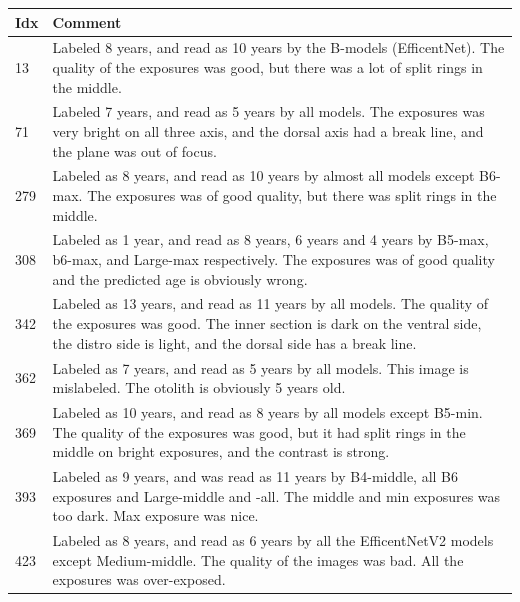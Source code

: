 \documentclass[10pt,letterpaper]{article}
\begin{document}
\pagebreak
    \centering
    \setlength\tabcolsep{1.5pt} %
    \renewcommand{\arraystretch}{0.8}
    \begin{tabular}{|l|p{13cm}|}
    \hline
        Idx & Comment \\ \hline
        13  & Labeled 8 years, and read as 10 years by the B-models (EfficentNet). \newline
              The quality of the exposures was good, but there was a lot of split rings in the middle. \\ \hline
        71  & Labeled 7 years, and read as 5 years by all models. \newline
              The exposures was very bright on all three axis, and the dorsal axis had a break line, and the plane was out of focus. \\ \hline
        279 & Labeled as 8 years, and read as 10 years by almost all models except B6-max. \newline
              The exposures was of good quality, but there was split rings in the middle. \\ \hline
        308 & Labeled as 1 year, and read as 8 years, 6 years and 4 years by B5-max, b6-max, and Large-max respectively.  \newline
              The exposures was of good quality and the predicted age is obviously wrong. \\ \hline
        342 & Labeled as 13 years, and read as 11 years by all models. The quality of the exposures was good. \newline
              The inner section is dark on the ventral side, the distro side is light, and the dorsal side has a break line.  \\ \hline
        362 & Labeled as 7 years, and read as 5 years by all models. This image is mislabeled. The otolith is obviously 5 years old.\\ \hline
        369 & Labeled as 10 years, and read as 8 years by all models except B5-min.   \newline
              The quality of the exposures was good, but it had split rings in the middle on bright exposures, and the contrast is strong. \\ \hline
        393 & Labeled as 9 years, and was read as 11 years by B4-middle, all B6 exposures and Large-middle and -all. \newline
              The middle and min exposures was too dark. Max exposure was nice. \\ \hline
        423 & Labeled as 8 years, and read as 6 years by all the EfficentNetV2 models except Medium-middle. \newline
              The quality of the images was bad. All the exposures was over-exposed. \\ \hline  
    \end{tabular}
\label{table10b}
\end{document}
